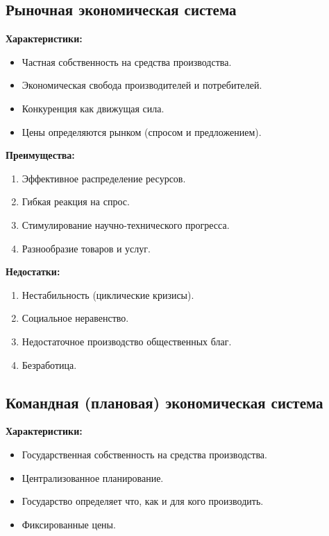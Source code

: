 \documentclass[12pt]{article}
\begin{document}
	\subsection{Рыночная экономическая система}
	
	\textbf{Характеристики:}
	\begin{itemize}
		\item Частная собственность на средства производства.
		\item Экономическая свобода производителей и потребителей.
		\item Конкуренция как движущая сила.
		\item Цены определяются рынком (спросом и предложением).
	\end{itemize}
	
	\noindent \textbf{Преимущества:}
	\begin{enumerate}
		\item Эффективное распределение ресурсов.
		\item Гибкая реакция на спрос.
		\item Стимулирование научно-технического прогресса.
		\item Разнообразие товаров и услуг.
	\end{enumerate}
	
	\noindent \textbf{Недостатки:}
	\begin{enumerate}
		\item Нестабильность (циклические кризисы).
		\item Социальное неравенство.
		\item Недостаточное производство общественных благ.
		\item Безработица.
	\end{enumerate}
	
	\subsection{Командная (плановая) экономическая система}
	
	\textbf{Характеристики:}
	\begin{itemize}
		\item Государственная собственность на средства производства.
		\item Централизованное планирование.
		\item Государство определяет что, как и для кого производить.
		\item Фиксированные цены.
	\end{itemize}
	
\end{document}
